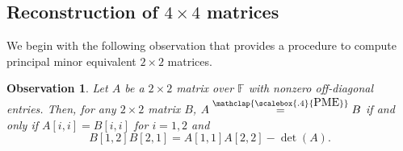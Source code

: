 \documentclass[11pt,letterpaper]{article}
\newcommand{\F}{\mathbb{F}}
\newtheorem{observation}{Observation}[section]
\newcommand{\PME}{\stackrel{\mathclap{\scalebox{.4}{\mbox{PME}}}}{=}}
\newcommand{\PMoracle}[1]{\textsc{PM}_{#1}}
\begin{document}
{{{\subsection{Reconstruction of  $4\times 4$ matrices}
\label{subsec:computing-upto-four-order-matrices}
We begin with the following observation that provides a procedure to compute principal minor equivalent $2\times 2$ matrices.
\begin{observation}
\label{prop:reconstruction-size-two-matrix}
Let $A$ be a $2\times 2$ matrix over $\F$ with nonzero off-diagonal entries. Then, for any $2\times 2$ matrix $B$, $A\PME B$ if and only if $A[i,i]=B[i,i]$ for $i=1,2$ and $$B[1,2]B[2,1]=A[1,1]A[2,2]-\det(A).$$ 
\end{observation}

}}}
\end{document}

